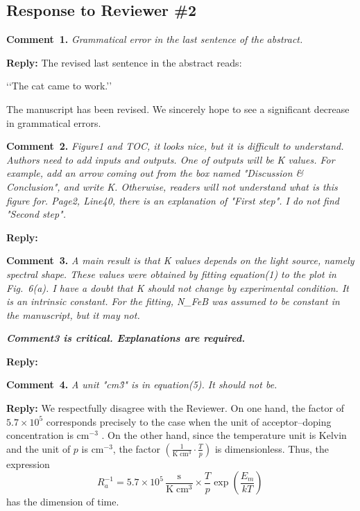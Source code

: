 \documentclass{WileyMSP-template}
\begin{document}
\vspace{1cm}
\subsection*{Response to Reviewer \#2 }


\noindent
\textcolor[rgb]{0.00,0.50,1.00}{\textbf{Comment~1.}}
\emph{Grammatical error in the last sentence of the abstract.}


\noindent
\textcolor[rgb]{0.51,0.00,0.00}{\textbf{Reply:}}
The revised last sentence in the abstract reads:

‘‘The cat came to work.’’

The manuscript has been revised.
We sincerely hope to see a significant decrease in grammatical errors.



\vspace{1cm}
\noindent
\textcolor[rgb]{0.00,0.50,1.00}{\textbf{Comment~2.}}
\emph{Figure1 and TOC, it looks nice, but it is difficult to understand.
Authors need to add inputs and outputs.
One of outputs will be K values.
For example, add an arrow coming out from the box named "Discussion \& Conclusion",
and write K.
Otherwise, readers will not understand what is this figure for.
Page2, Line40, there is an explanation of "First step".
I do not find "Second step".}

\noindent
\textcolor[rgb]{0.51,0.00,0.00}{\textbf{Reply:}}


\vspace{1cm}
\noindent
\textcolor[rgb]{0.00,0.50,1.00}{\textbf{Comment~3.}}
\emph{A main result is that K values depends on the light source, namely spectral shape.
These values were obtained by fitting equation(1) to the plot in Fig.~6(a).
I have a doubt that K should not change by experimental condition.
It is an intrinsic constant.
For the fitting, N\_FeB was assumed to be constant in the manuscript, but it may not.}

\emph{
\textbf{Comment3 is critical. Explanations are required.}
}

\noindent
\textcolor[rgb]{0.51,0.00,0.00}{\textbf{Reply:}}



\vspace{1cm}
\noindent
\textcolor[rgb]{0.00,0.50,1.00}{\textbf{Comment~4.}}
\emph{A unit "cm\^3" is in equation(5). It should not be.}

\noindent
\textcolor[rgb]{0.51,0.00,0.00}{\textbf{Reply:}}
We respectfully disagree with the Reviewer.
On one hand, the factor of $5.7\times10^5$
corresponds precisely to the case
when the unit of acceptor--doping concentration is cm$^{-3}$ \cite{FeBAssJAP2014,FeBKin2019,FeBAssSST2011}. 
On the other hand,
since the temperature unit is Kelvin
and the unit of $p$ is cm$^{-3}$,
the factor $\left(\frac{1}{\mathrm{K}\;\mathrm{cm}^3}\cdot\frac{T}{p}\right)$ is dimensionless. 
Thus, the expression
\begin{equation}
\label{eqTass}
R_a^{-1}=5.7\times10^5\,\frac{\mathrm{s}}{\mathrm{K}\;\mathrm{cm}^3}\times\frac{T}{p}\exp\left(\frac{E_m}{kT}\right)\,
\end{equation}
has the dimension of time.
\end{document}
